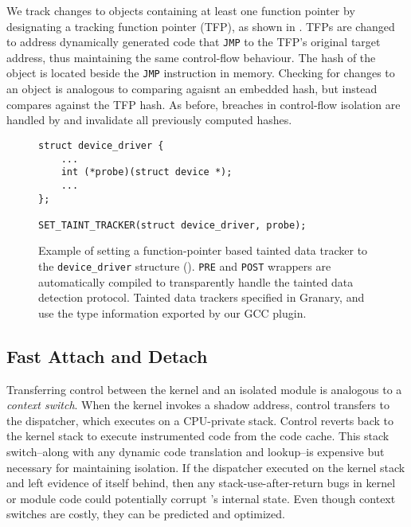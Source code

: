\documentclass[10pt,preprint]{sigplanconf}
\begin{document}
We track changes to objects containing at least one function pointer by designating a tracking function pointer (TFP), as shown in . TFPs are changed to address dynamically generated code that \texttt{JMP} to the TFP's original target address, thus maintaining the same control-flow behaviour. The hash of the object is located beside the \texttt{JMP} instruction in memory. Checking for changes to an object is analogous to comparing agaisnt an embedded hash, but instead compares against the TFP hash. As before, breaches in control-flow isolation are handled by {\sysname} and invalidate all previously computed hashes.

\begin{figure}
\lstset{language=C, tabsize=2, stepnumber=1}
\begin{lstlisting}[basicstyle=\footnotesize\ttfamily]
struct device_driver {
	...
	int (*probe)(struct device *);
	...
};

SET_TAINT_TRACKER(struct device_driver, probe);
\end{lstlisting}
\caption{Example of setting a function-pointer based tainted data tracker to the \texttt{device\_driver} structure (). \texttt{PRE} and \texttt{POST} wrappers are automatically compiled to transparently handle the tainted data detection protocol. Tainted data trackers specified in Granary, and use the type information exported by our GCC plugin.}
\label{fig:tracker}
\end{figure}


\subsection{Fast Attach and Detach \label{sec:fast_trans}}
Transferring control between the kernel and an isolated module is analogous to a \emph{context switch}. When the kernel invokes a shadow address, control transfers to the {\sysname} dispatcher, which executes on a CPU-private stack. Control reverts back to the kernel stack to execute instrumented code from the code cache. This stack switch--along with any dynamic code translation and lookup--is expensive but necessary for maintaining isolation. If the dispatcher executed on the kernel stack and left evidence of itself behind, then any stack-use-after-return bugs in kernel or module code could potentially corrupt {\sysname}'s internal state. Even though context switches are costly, they can be predicted and optimized.
\end{document}
